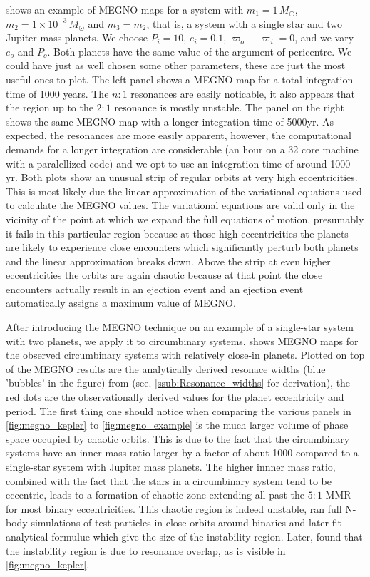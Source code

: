 \documentclass[ twoside,openright,titlepage,numbers=noenddot,headinclude,%
                footinclude=true,cleardoublepage=empty,abstractoff, %
                BCOR=5mm,paper=a4,fontsize=11pt,%
                american,%
                ]{scrreprt}
\begin{document}
 shows an example of MEGNO maps for a system
with $m_1=1\,M_\odot$, $m_2=1\times 10^{-3}\,M_\odot$ and $m_3=m_2$,
that is, a system with a single star and two Jupiter mass planets.
We choose $P_i=10$, $e_i=0.1$, $\varpi_o-\varpi_i=0$, and 
we vary $e_o$ and $P_o$.
Both planets have the same  value of the argument
of pericentre. We
could have just as well chosen some other parameters, these are just
the most useful ones to plot.  The left panel shows a MEGNO map for a total 
integration time of 1000 years. The $n:1$ 
resonances are easily noticable, it also appears that the region
up to the $2:1$ resonance is mostly unstable. The panel on the right
shows the same MEGNO map with a longer integration time of 5000yr.
As expected, the resonances are more easily apparent, however, the
computational demands for a longer integration are considerable (an 
hour on a 32 core machine with a paralellized code) and 
we opt to use an integration time of around 1000 yr. Both plots
show an unusual strip of regular orbits at very high eccentricities.
This is most likely due the linear approximation of the variational
equations used to calculate the MEGNO values. The variational equations
are valid only in the vicinity of the point at which we expand the
full equations of motion, presumably it fails in this particular 
region because at those high eccentricities the planets are likely
to experience close encounters which significantly perturb both 
planets and the linear approximation breaks down. Above the strip at
even higher eccentricities the orbits are again chaotic because at
that point the close encounters actually result in an ejection event
and an ejection event automatically assigns a maximum value of 
MEGNO.

After introducing the MEGNO technique on an example of a single-star 
system with two planets, we apply it to circumbinary systems.
 shows MEGNO maps for the observed circumbinary
systems with relatively close-in planets. Plotted on top of the 
MEGNO results are the analytically derived resonace widths (blue 'bubbles'
in the figure) from
\cite{Mardling2013} (see. \cref{ssub:Resonance_widths} for derivation), 
the red dots are the observationally derived values for the 
planet eccentricity and period. The first thing one should notice when
comparing the various panels in \cref{fig:megno_kepler} to 
\cref{fig:megno_example}  is the much larger volume of phase space 
occupied by chaotic orbits. This is due to the fact that the circumbinary
systems have an inner mass ratio larger by a factor of about 1000 compared
to a single-star system with Jupiter mass planets. The higher innner
mass ratio, combined with the fact that the stars in a circumbinary
system tend to be eccentric, leads to a formation of chaotic zone
extending all past the $5:1$ MMR for most binary eccentricities. 
This chaotic region is indeed unstable, \cite{Holman1999} ran full 
N-body simulations of test particles in close orbits around binaries
and later fit analytical formulue which give the size of the instability
region. Later, \cite{Mudryk2006} found that the instability region
is due to resonance overlap, as is visible in \cref{fig:megno_kepler}.
\end{document}
